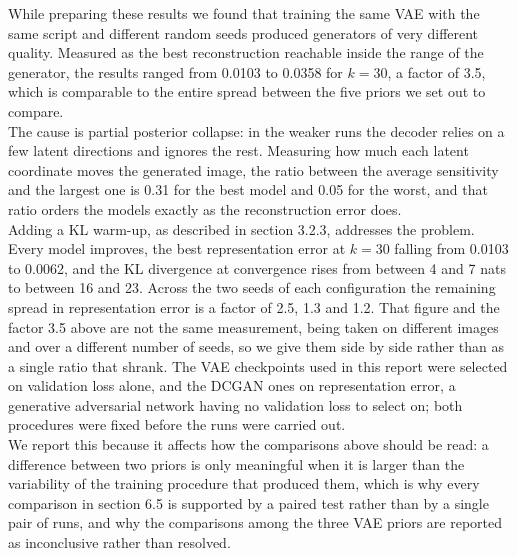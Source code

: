 While preparing these results we found that training the same VAE with the same script and different random seeds produced generators of very different quality. Measured as the best reconstruction reachable inside the range of the generator, the results ranged from 0.0103 to 0.0358 for \( k = 30 \), a factor of 3.5, which is comparable to the entire spread between the five priors we set out to compare.
\\
The cause is partial posterior collapse: in the weaker runs the decoder relies on a few latent directions and ignores the rest. Measuring how much each latent coordinate moves the generated image, the ratio between the average sensitivity and the largest one is 0.31 for the best model and 0.05 for the worst, and that ratio orders the models exactly as the reconstruction error does.
\\
Adding a KL warm-up, as described in section 3.2.3, addresses the problem. Every model improves, the best representation error at \( k = 30 \) falling from 0.0103 to 0.0062, and the KL divergence at convergence rises from between 4 and 7 nats to between 16 and 23. Across the two seeds of each configuration the remaining spread in representation error is a factor of 2.5, 1.3 and 1.2. That figure and the factor 3.5 above are not the same measurement, being taken on different images and over a different number of seeds, so we give them side by side rather than as a single ratio that shrank. The VAE checkpoints used in this report were selected on validation loss alone, and the DCGAN ones on representation error, a generative adversarial network having no validation loss to select on; both procedures were fixed before the runs were carried out.
\\
We report this because it affects how the comparisons above should be read: a difference between two priors is only meaningful when it is larger than the variability of the training procedure that produced them, which is why every comparison in section 6.5 is supported by a paired test rather than by a single pair of runs, and why the comparisons among the three VAE priors are reported as inconclusive rather than resolved.
